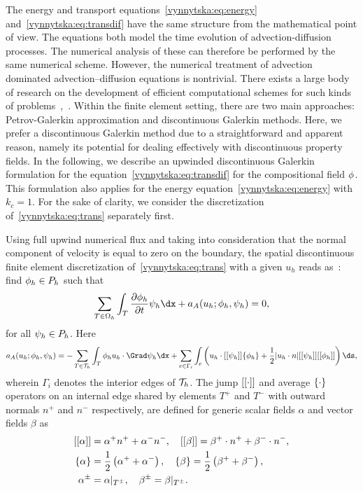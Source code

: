 The energy and transport equations~\eqref{vynnytska:eq:energy}
and~\eqref{vynnytska:eq:transdif} have the same structure from the
mathematical point of view. The equations both model the time
evolution of advection-diffusion processes. The numerical analysis of
these can therefore be performed by the same numerical
scheme. However, the numerical treatment of advection dominated
advection--diffusion equations is nontrivial. There exists a large
body of research on the development of efficient computational schemes
for such kinds of
problems~\citep{Lin2006},~\citep{ZienkiewiczTaylor2000}.  Within the
finite element setting, there are two main approaches: Petrov-Galerkin
approximation and discontinuous Galerkin methods. Here, we prefer a
discontinuous Galerkin method due to a straightforward and apparent
reason, namely its potential for dealing effectively with
discontinuous property fields. In the following, we describe an
upwinded discontinuous Galerkin formulation for the
equation~\eqref{vynnytska:eq:transdif} for the compositional field
$\phi$. This formulation also applies for the energy
equation~\eqref{vynnytska:eq:energy} with $k_c = 1$. For the sake of
clarity, we consider the discretization of~\eqref{vynnytska:eq:trans}
separately first.

Using full upwind numerical flux and taking into consideration that
the normal component of velocity is equal to zero on the boundary, the
spatial discontinuous finite element discretization
of~\eqref{vynnytska:eq:trans} with a given $u_h$ reads
as~\citep{PietroLoForteParolini2006}: find $\phi_h \in P_h$
such that
\begin{equation}
  \sum_{T \in \Omega_h} \int_T \frac{\partial \composition_h}{\partial t} \test_h
  \dx + a_{A} (u_h; \composition_h, \test_h) = 0,
\end{equation}
for all $\psi_h \in P_h$. Here
\begin{equation}
  \label{vynnytska:eq:dgadv}
   a_{A} (u_h; \composition_h, \test_h )
   =
   - \sum_{T \in \triang_h} \int_T \composition_h u_h \cdot \Grad \test_h \dx
   + \sum_{e \in \Gamma_i} \int_{e} \left (
   u_h \cdot \jump{\test_h} \avg{\composition_h} + \frac{1}{2}
   | u_h \cdot n | \jump{\test_h} \jump{\composition_h} \right ) \ds,
\end{equation}
wherein $\Gamma_i$ denotes the interior edges of $\mathcal{T}_h$. The jump
$[[\cdot]]$ and average $\{\cdot\}$ operators on an internal edge
shared by elements $T^{+}$ and $T^{-}$ with outward normals $n^+$ and
$n^-$ respectively, are defined for generic scalar fields $\alpha$ and
vector fields $\beta$ as
\begin{align*}
  [[\alpha]]&= \alpha^{+} n^{+} + \alpha^{-} n^{-}, \quad
  [[\beta]]  = \beta^{+} \cdot n^{+} + \beta^{-} \cdot n^{-}, \\
  \{\alpha\} &= \frac{1}{2} \left( \alpha^{+} + \alpha^{-} \right), \quad
  \{\beta\}   = \frac{1}{2} \left( \beta^{+} + \beta^{-} \right), \\
  \alpha^{\pm}  &= \alpha |_{T^{\pm}}, \quad
  \beta^{\pm}    = \beta |_{T^{\pm}}.
\end{align*}

